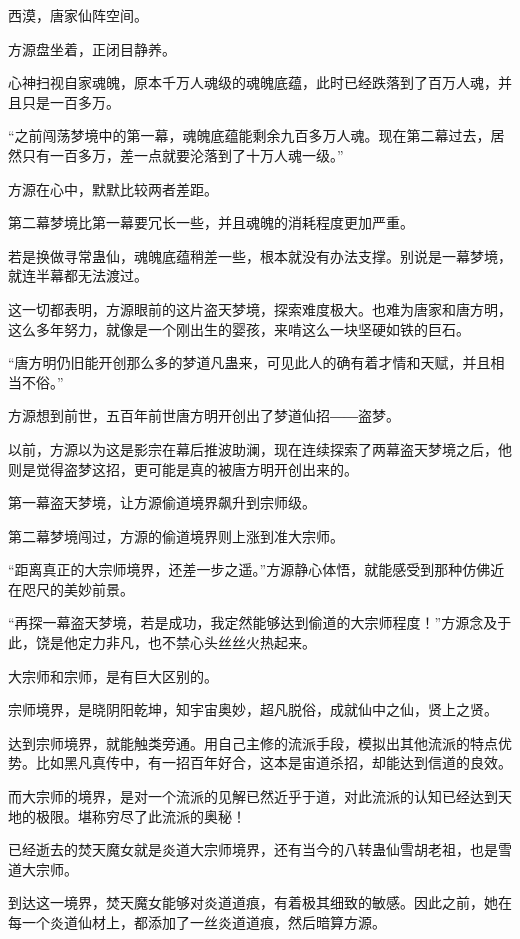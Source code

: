 
\begin{this_body}

西漠，唐家仙阵空间。

方源盘坐着，正闭目静养。

心神扫视自家魂魄，原本千万人魂级的魂魄底蕴，此时已经跌落到了百万人魂，并且只是一百多万。

“之前闯荡梦境中的第一幕，魂魄底蕴能剩余九百多万人魂。现在第二幕过去，居然只有一百多万，差一点就要沦落到了十万人魂一级。”

方源在心中，默默比较两者差距。

第二幕梦境比第一幕要冗长一些，并且魂魄的消耗程度更加严重。

若是换做寻常蛊仙，魂魄底蕴稍差一些，根本就没有办法支撑。别说是一幕梦境，就连半幕都无法渡过。

这一切都表明，方源眼前的这片盗天梦境，探索难度极大。也难为唐家和唐方明，这么多年努力，就像是一个刚出生的婴孩，来啃这么一块坚硬如铁的巨石。

“唐方明仍旧能开创那么多的梦道凡蛊来，可见此人的确有着才情和天赋，并且相当不俗。”

方源想到前世，五百年前世唐方明开创出了梦道仙招――盗梦。

以前，方源以为这是影宗在幕后推波助澜，现在连续探索了两幕盗天梦境之后，他则是觉得盗梦这招，更可能是真的被唐方明开创出来的。

第一幕盗天梦境，让方源偷道境界飙升到宗师级。

第二幕梦境闯过，方源的偷道境界则上涨到准大宗师。

“距离真正的大宗师境界，还差一步之遥。”方源静心体悟，就能感受到那种仿佛近在咫尺的美妙前景。

“再探一幕盗天梦境，若是成功，我定然能够达到偷道的大宗师程度！”方源念及于此，饶是他定力非凡，也不禁心头丝丝火热起来。

大宗师和宗师，是有巨大区别的。

宗师境界，是晓阴阳乾坤，知宇宙奥妙，超凡脱俗，成就仙中之仙，贤上之贤。

达到宗师境界，就能触类旁通。用自己主修的流派手段，模拟出其他流派的特点优势。比如黑凡真传中，有一招百年好合，这本是宙道杀招，却能达到信道的良效。

而大宗师的境界，是对一个流派的见解已然近乎于道，对此流派的认知已经达到天地的极限。堪称穷尽了此流派的奥秘！

已经逝去的焚天魔女就是炎道大宗师境界，还有当今的八转蛊仙雪胡老祖，也是雪道大宗师。

到达这一境界，焚天魔女能够对炎道道痕，有着极其细致的敏感。因此之前，她在每一个炎道仙材上，都添加了一丝炎道道痕，然后暗算方源。


\end{this_body}
